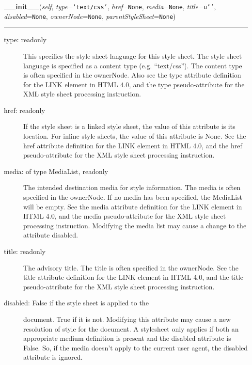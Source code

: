 \hspace{.8\funcindent}\begin{boxedminipage}{\funcwidth}

    \raggedright \textbf{\_\_init\_\_}(\textit{self}, \textit{type}={\tt \texttt{'}\texttt{text/css}\texttt{'}}, \textit{href}={\tt None}, \textit{media}={\tt None}, \textit{title}={\tt \texttt{u'}\texttt{}\texttt{'}}, \textit{disabled}={\tt None}, \textit{ownerNode}={\tt None}, \textit{parentStyleSheet}={\tt None})

    \vspace{-1.5ex}

    \rule{\textwidth}{0.5\fboxrule}
\setlength{\parskip}{2ex}
\begin{description}
\item[{type: readonly}] \leavevmode 
This specifies the style sheet language for this
style sheet. The style sheet language is specified
as a content type (e.g. ``text/css''). The content
type is often specified in the ownerNode. Also see
the type attribute definition for the LINK element
in HTML 4.0, and the type pseudo-attribute for the
XML style sheet processing instruction.

\item[{href: readonly}] \leavevmode 
If the style sheet is a linked style sheet, the value
of this attribute is its location. For inline style
sheets, the value of this attribute is None. See the
href attribute definition for the LINK element in HTML
4.0, and the href pseudo-attribute for the XML style
sheet processing instruction.

\item[{media: of type MediaList, readonly}] \leavevmode 
The intended destination media for style information.
The media is often specified in the ownerNode. If no
media has been specified, the MediaList will be empty.
See the media attribute definition for the LINK element
in HTML 4.0, and the media pseudo-attribute for the XML
style sheet processing instruction. Modifying the media
list may cause a change to the attribute disabled.

\item[{title: readonly}] \leavevmode 
The advisory title. The title is often specified in
the ownerNode. See the title attribute definition for
the LINK element in HTML 4.0, and the title
pseudo-attribute for the XML style sheet processing
instruction.

\item[{disabled: False if the style sheet is applied to the}] \leavevmode 
document. True if it is not. Modifying this attribute
may cause a new resolution of style for the document.
A stylesheet only applies if both an appropriate medium
definition is present and the disabled attribute is False.
So, if the media doesn't apply to the current user agent,
the disabled attribute is ignored.


\end{description}
\end{boxedminipage}
